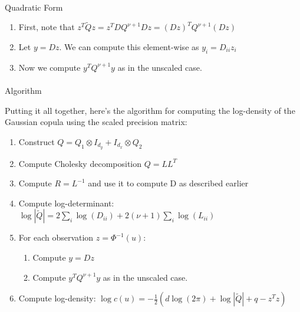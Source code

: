 \documentclass[journal=,manuscript=]{achemso}
\makeatletter
\let\oldparagraph\paragraph
\renewcommand{\paragraph}{
    \@ifstar
      \xxxParagraphStar
      \xxxParagraphNoStar
  }
\newcommand{\xxxParagraphStar}[1]{\oldparagraph*{#1}\mbox{}}
\newcommand{\xxxParagraphNoStar}[1]{\oldparagraph{#1}\mbox{}}
\providecommand{\tightlist}{%
  \setlength{\itemsep}{0pt}\setlength{\parskip}{0pt}}\usepackage{longtable,booktabs,array}
\makeatother
\begin{document}
\paragraph{Quadratic Form}\label{quadratic-form}

\begin{enumerate}
\def\labelenumi{\arabic{enumi}.}
\tightlist
\item
  First, note that
  \(z^T\tilde{Q}z = z^TDQ^{\nu+1}Dz = (Dz)^TQ^{\nu+1}(Dz)\)
\item
  Let \(y = Dz\). We can compute this element-wise as
  \(y_i = D_{ii}z_i\)
\item
  Now we compute \(y^TQ^{\nu+1}y\) as in the unscaled case.
\end{enumerate}

\paragraph{Algorithm}\label{algorithm-1}

Putting it all together, here's the algorithm for computing the
log-density of the Gaussian copula using the scaled precision matrix:

\begin{enumerate}
\def\labelenumi{\arabic{enumi}.}
\tightlist
\item
  Construct \(Q = Q_1 \otimes I_{d_y} + I_{d_x} \otimes Q_2\)
\item
  Compute Cholesky decomposition \(Q = LL^T\)
\item
  Compute \(R = L^{-1}\) and use it to compute D as described earlier
\item
  Compute log-determinant:
  \(\log|\tilde{Q}| = 2\sum_i \log(D_{ii}) + 2(\nu+1)\sum_i \log(L_{ii})\)
\item
  For each observation \(z = \Phi^{-1}(u)\):

  \begin{enumerate}
  \def\labelenumii{\roman{enumii})}
  \tightlist
  \item
    Compute \(y = Dz\)
  \item
    Compute \(y^TQ^{\nu+1}y\) as in the unscaled case.
  \end{enumerate}
\item
  Compute log-density:
  \(\log c(u) = -\frac{1}{2}(d\log(2\pi) + \log|\tilde{Q}| + q - z^Tz)\)
\end{enumerate}
\end{document}
